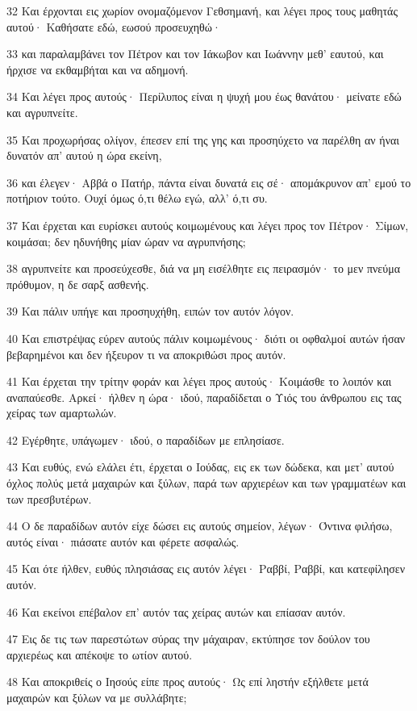 \par 32 Και έρχονται εις χωρίον ονομαζόμενον Γεθσημανή, και λέγει προς τους μαθητάς αυτού· Καθήσατε εδώ, εωσού προσευχηθώ·
\par 33 και παραλαμβάνει τον Πέτρον και τον Ιάκωβον και Ιωάννην μεθ' εαυτού, και ήρχισε να εκθαμβήται και να αδημονή.
\par 34 Και λέγει προς αυτούς· Περίλυπος είναι η ψυχή μου έως θανάτου· μείνατε εδώ και αγρυπνείτε.
\par 35 Και προχωρήσας ολίγον, έπεσεν επί της γης και προσηύχετο να παρέλθη αν ήναι δυνατόν απ' αυτού η ώρα εκείνη,
\par 36 και έλεγεν· Αββά ο Πατήρ, πάντα είναι δυνατά εις σέ· απομάκρυνον απ' εμού το ποτήριον τούτο. Ουχί όμως ό,τι θέλω εγώ, αλλ' ό,τι συ.
\par 37 Και έρχεται και ευρίσκει αυτούς κοιμωμένους και λέγει προς τον Πέτρον· Σίμων, κοιμάσαι; δεν ηδυνήθης μίαν ώραν να αγρυπνήσης;
\par 38 αγρυπνείτε και προσεύχεσθε, διά να μη εισέλθητε εις πειρασμόν· το μεν πνεύμα πρόθυμον, η δε σαρξ ασθενής.
\par 39 Και πάλιν υπήγε και προσηυχήθη, ειπών τον αυτόν λόγον.
\par 40 Και επιστρέψας εύρεν αυτούς πάλιν κοιμωμένους· διότι οι οφθαλμοί αυτών ήσαν βεβαρημένοι και δεν ήξευρον τι να αποκριθώσι προς αυτόν.
\par 41 Και έρχεται την τρίτην φοράν και λέγει προς αυτούς· Κοιμάσθε το λοιπόν και αναπαύεσθε. Αρκεί· ήλθεν η ώρα· ιδού, παραδίδεται ο Υιός του άνθρωπου εις τας χείρας των αμαρτωλών.
\par 42 Εγέρθητε, υπάγωμεν· ιδού, ο παραδίδων με επλησίασε.
\par 43 Και ευθύς, ενώ ελάλει έτι, έρχεται ο Ιούδας, εις εκ των δώδεκα, και μετ' αυτού όχλος πολύς μετά μαχαιρών και ξύλων, παρά των αρχιερέων και των γραμματέων και των πρεσβυτέρων.
\par 44 Ο δε παραδίδων αυτόν είχε δώσει εις αυτούς σημείον, λέγων· Όντινα φιλήσω, αυτός είναι· πιάσατε αυτόν και φέρετε ασφαλώς.
\par 45 Και ότε ήλθεν, ευθύς πλησιάσας εις αυτόν λέγει· Ραββί, Ραββί, και κατεφίλησεν αυτόν.
\par 46 Και εκείνοι επέβαλον επ' αυτόν τας χείρας αυτών και επίασαν αυτόν.
\par 47 Εις δε τις των παρεστώτων σύρας την μάχαιραν, εκτύπησε τον δούλον του αρχιερέως και απέκοψε το ωτίον αυτού.
\par 48 Και αποκριθείς ο Ιησούς είπε προς αυτούς· Ως επί ληστήν εξήλθετε μετά μαχαιρών και ξύλων να με συλλάβητε;
